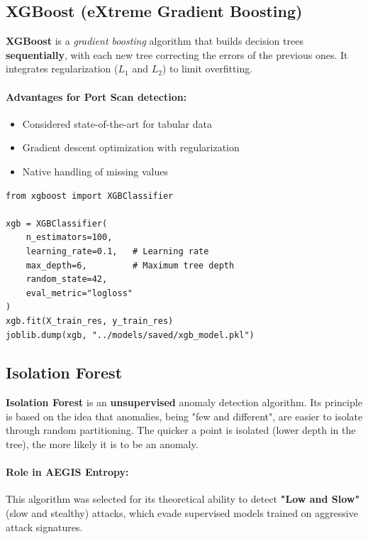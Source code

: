 \subsection{XGBoost (eXtreme Gradient Boosting)}

\textbf{XGBoost} is a \textit{gradient boosting} algorithm that builds decision trees \textbf{sequentially}, with each new tree correcting the errors of the previous ones. It integrates regularization ($L_1$ and $L_2$) to limit overfitting.

\paragraph{Advantages for Port Scan detection:}
\begin{itemize}
    \item Considered state-of-the-art for tabular data
    \item Gradient descent optimization with regularization
    \item Native handling of missing values
\end{itemize}

\begin{lstlisting}[caption={XGBoost Training}]
from xgboost import XGBClassifier

xgb = XGBClassifier(
    n_estimators=100,
    learning_rate=0.1,   # Learning rate
    max_depth=6,         # Maximum tree depth
    random_state=42,
    eval_metric="logloss"
)
xgb.fit(X_train_res, y_train_res)
joblib.dump(xgb, "../models/saved/xgb_model.pkl")
\end{lstlisting}

\subsection{Isolation Forest}

\textbf{Isolation Forest} is an \textbf{unsupervised} anomaly detection algorithm. Its principle is based on the idea that anomalies, being "few and different", are easier to isolate through random partitioning. The quicker a point is isolated (lower depth in the tree), the more likely it is to be an anomaly.

\paragraph{Role in AEGIS Entropy:} This algorithm was selected for its theoretical ability to detect \textbf{"Low and Slow"} (slow and stealthy) attacks, which evade supervised models trained on aggressive attack signatures.

